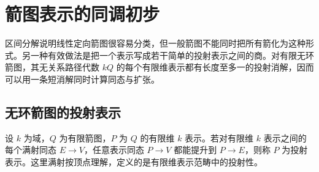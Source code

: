 
\section{箭图表示的同调初步}
\label{b5:sec:0904}


%
%

区间分解说明线性定向箭图很容易分类，但一般箭图不能同时把所有箭化为这种形式。另一种有效做法是把一个表示写成若干简单的投射表示之间的商。对有限无环箭图，其无关系路径代数 \(kQ\) 的每个有限维表示都有长度至多一的投射消解，因而可以用一条短消解同时计算同态与扩张。

\subsection{无环箭图的投射表示}
\label{b5:subsec:0904:01}

设 \(k\) 为域，\(Q\) 为有限箭图，\(P\) 为 \(Q\) 的有限维 \(k\) 表示。若对有限维 \(k\) 表示之间的每个满射同态 \(E\to V\)，任意表示同态 \(P\to V\) 都能提升到 \(P\to E\)，则称 \(P\) 为投射表示。这里满射按顶点理解，定义的是有限维表示范畴中的投射性。

\ProseParagraphBreak

